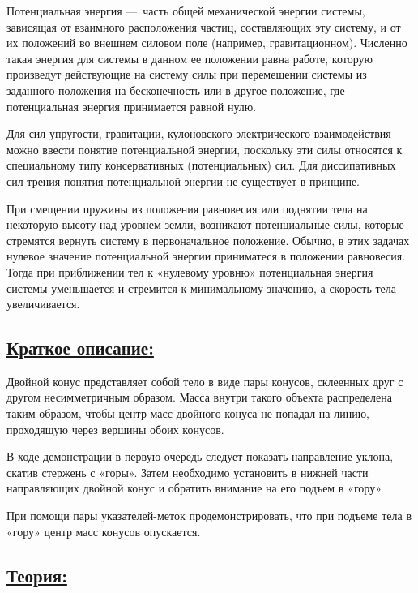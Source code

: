 \documentclass[14pt,a4paper,oneside]{extarticle}	%
\begin{document}
	Потенциальная энергия — часть общей механической энергии системы, зависящая от взаимного расположения частиц, составляющих эту систему, и от их положений во внешнем силовом поле (например, гравитационном).
	Численно такая энергия для системы в данном ее положении равна работе, которую произведут действующие на систему силы при перемещении системы из заданного положения на бесконечность или в другое положение, где потенциальная энергия принимается равной нулю.
	
	Для сил упругости, гравитации, кулоновского электрического взаимодействия можно ввести понятие потенциальной энергии, поскольку эти силы относятся к специальному типу консервативных (потенциальных) сил.
	Для диссипативных сил трения понятия потенциальной энергии не существует в принципе.
	
	При смещении пружины из положения равновесия или поднятии тела на некоторую высоту над уровнем земли, возникают потенциальные силы, которые стремятся вернуть систему в первоначальное положение.
	Обычно, в этих задачах нулевое значение потенциальной энергии приниматеся в положении равновесия.
	Тогда при приближении тел к «нулевому уровню» потенциальная энергия системы уменьшается и стремится к минимальному значению, а скорость тела увеличивается.
	
	\subsection*{\underline{Краткое описание:}}
		
		Двойной конус представляет собой тело в виде пары конусов, склеенных друг с другом несимметричным образом.
		Масса внутри такого объекта распределена таким образом, чтобы центр масс двойного конуса не попадал на линию, проходящую через вершины обоих конусов. %
		
		В ходе демонстрации в первую очередь следует показать направление уклона, скатив стержень с «горы».
		Затем необходимо установить в нижней части направляющих двойной конус и обратить внимание на его подъем в «гору».
		
		При помощи пары указателей-меток продемонстрировать, что при подъеме тела в «гору» центр масс конусов опускается.


		\subsection*{\underline{Теория:}}
\end{document}
